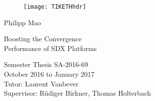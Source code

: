   \begin{titlepage}

  \begin{center}
  \begin{figure}[!t]
     \texttt{[image: TIKETHhdr]}
  \end{figure}
  \end{center}

  \vspace{2 cm}

  {\large Philipp Mao}
  \vspace{2 cm}

  {\Huge Boosting the Convergence \\ Performance of SDX Platforms}\\

  \vspace{\fill}


  Semester Thesis SA-2016-69\\
  October 2016 to January 2017\\

  \vspace{1cm}
  Tutor: Laurent Vanbever \\
  Supervisor: R\"udiger Birkner, Thomas Holterbach \\
    
  \end{titlepage}
